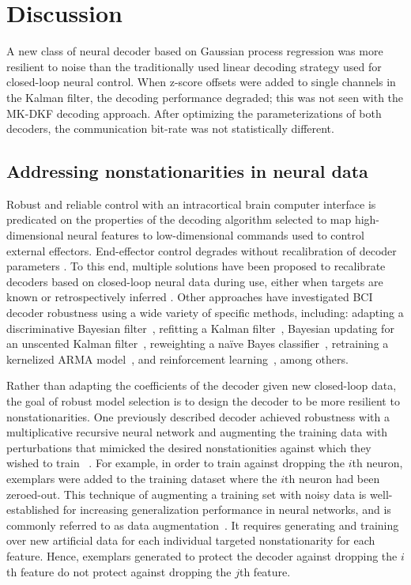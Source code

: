 \section{Discussion}

A new class of neural decoder based on Gaussian process regression was more resilient to noise than the traditionally used linear decoding strategy used for closed-loop neural control. When z-score offsets were added to single channels in the Kalman filter, the decoding performance degraded; this was not seen with the MK-DKF decoding approach. After optimizing the parameterizations of both decoders, the communication bit-rate was not statistically different. 

\subsection{Addressing nonstationarities in neural data}  

Robust and reliable control with an intracortical brain computer interface is predicated on the properties of the decoding algorithm selected to map high-dimensional neural features to low-dimensional commands used to control external effectors. End-effector control degrades without recalibration of decoder parameters \cite{Jarosiewicz2015, Perge2013}. To this end, multiple solutions have been proposed to recalibrate decoders based on closed-loop neural data during use, either when targets are known \cite{Hochberg2006, Kim2008, Hochberg2012, Jarosiewicz2013, Collinger2013, Wodlinger2015, Gilja2015, Orsborn2014, Shanechi2017, Dangi2011, Carmena2013} or retrospectively inferred \cite{Jarosiewicz2015}. Other approaches have investigated BCI decoder robustness using a wide variety of specific methods, including: adapting a discriminative Bayesian filter~\cite{Brandman2018}, refitting a Kalman filter~\cite{Gil12, Dan13}, Bayesian updating for an unscented Kalman filter~\cite{Li11}, reweighting a na\"ive Bayes classifier~\cite{Bis14}, retraining a kernelized ARMA model~\cite{Shp09}, and reinforcement learning~\cite{Mah13,Poh14}, among others.  

Rather than adapting the coefficients of the decoder given new closed-loop data, the goal of robust model selection is to design the decoder to be more resilient to nonstationarities. One previously described decoder achieved robustness with a multiplicative recursive neural network and augmenting the training data with perturbations that mimicked the desired nonstationities against which they wished to train ~\cite{Sus16}. For example, in order to train against dropping the $i$th neuron, exemplars were added to the training dataset where the $i$th neuron had been zeroed-out.  This technique of augmenting a training set with noisy data is well-established for increasing generalization performance in neural networks, and is commonly referred to as data augmentation~\cite{An96}.  It requires generating and training over new artificial data for each individual targeted nonstationarity for each feature.  Hence, exemplars generated to protect the decoder against dropping the $i$th feature do not protect against dropping the $j$th feature. 

